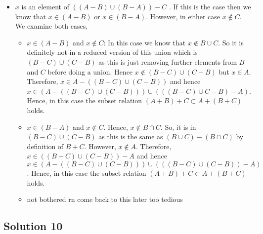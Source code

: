   \begin{itemize}
   \item \( x  \) is an element of \( \left( \left( A - B \right) \cup \left( B - A \right) \right) - C \) . If this is the case then
     we know that \( x \in \left( A - B \right) \) or \( x \in  \left( B - A \right) \). However, in either case
     \( x \notin C \). We examine both cases,
     \begin{itemize}
      \item \( x \in \left( A - B \right) \) and \( x \notin C \): In this case we know that
        \( x \notin B \cup C \). So it is definitely not in a reduced version of this union which is
        \( \left( B - C \right) \cup  \left( C - B \right) \) as this is just removing further elements from
        \( B  \) and \( C \) before doing a union. Hence \( x \notin \left( B - C \right) \cup \left( C - B \right) \) but \( x \in A \). 
        Therefore, \( x \in A - \left( \left( B - C \right) \cup \left( C - B \right) \right)\) and hence 
        \( x \in  \left( A - \left( \left( B - C \right) \cup  \left( C - B \right) \right) \right) \cup \left( \left( \left( B - C \right) \cup  C - B \right) - A \right)\). Hence,
        in this case the subset relation \( \left( A + B \right) + C \subset A +  \left(   B + C\right) \) holds.

      \item \( x \in  \left( B - A \right) \) and \( x \notin C \). Hence, \( x \notin B \cap C \). So, it is in
        \( \left( B - C \right) \cup  \left( C - B \right) \) as this is the same as \( \left( B \cup C \right) - \left( B \cap C \right) \) by definition of \( B + C \). However, \( x \notin A \).
      Therefore, \( x \in  \left( \left( B - C \right) \cup \left( C - B \right)  \right)  - A \) and hence \( x \in \left( A - \left( \left( B - C \right) \cup \left( C - B \right) \right) \right) \cup \left( \left( \left( B - C \right) \cup \left( C - B \right) \right)  - A \right) \).
      Hence, in this case the subset relation \( \left( A + B \right) + C \subset A + \left( B + C \right) \) holds.

      \item not bothered rn come back to this later too tedious
    \end{itemize}
  \end{itemize}

\subsection{Solution 10}

